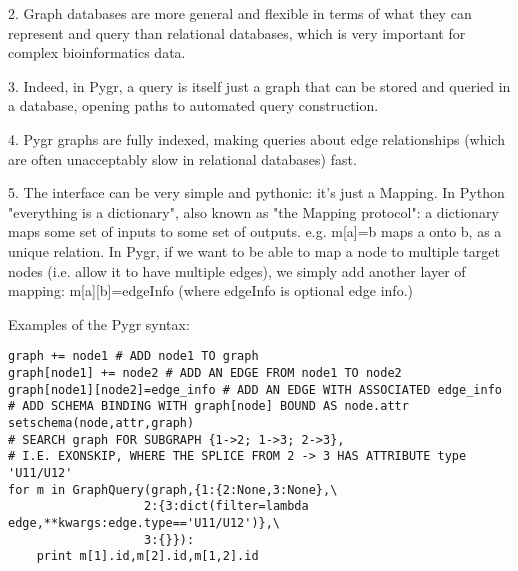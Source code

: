 \documentclass{howto}
\begin{document}
   2. Graph databases are more general and flexible in terms of what they can represent and query than relational databases, which is very important for complex bioinformatics data.

   3. Indeed, in Pygr, a query is itself just a graph that can be stored and queried in a database, opening paths to automated query construction.

   4. Pygr graphs are fully indexed, making queries about edge relationships (which are often unacceptably slow in relational databases) fast.

   5. The interface can be very simple and pythonic: it's just a Mapping.  In Python "everything is a dictionary", also known as "the Mapping protocol": a dictionary maps some set of inputs to some set of outputs. e.g. m[a]=b maps a onto b, as a unique relation.  In Pygr, if we want to be able to map a node to multiple target nodes (i.e. allow it to have multiple edges), we simply add another layer of mapping: m[a][b]=edgeInfo (where edgeInfo is optional edge info.)

Examples of the Pygr syntax:

\begin{verbatim}
graph += node1 # ADD node1 TO graph
graph[node1] += node2 # ADD AN EDGE FROM node1 TO node2
graph[node1][node2]=edge_info # ADD AN EDGE WITH ASSOCIATED edge_info
# ADD SCHEMA BINDING WITH graph[node] BOUND AS node.attr
setschema(node,attr,graph) 
# SEARCH graph FOR SUBGRAPH {1->2; 1->3; 2->3}, 
# I.E. EXONSKIP, WHERE THE SPLICE FROM 2 -> 3 HAS ATTRIBUTE type 'U11/U12' 
for m in GraphQuery(graph,{1:{2:None,3:None},\
                   2:{3:dict(filter=lambda edge,**kwargs:edge.type=='U11/U12')},\
                   3:{}}):
    print m[1].id,m[2].id,m[1,2].id
\end{verbatim}
\end{document}
